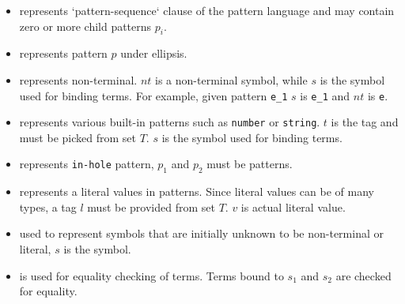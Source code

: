 \begin{itemize}
\item
\PatternSequence represents `pattern-sequence` clause of the pattern language and may contain zero or more child patterns $p_i$.

\item 
\Repeat represents pattern $p$ under ellipsis.

\item 
\Nt represents non-terminal. $nt$ is a non-terminal symbol, while $s$ is the symbol used for binding terms. For example, given pattern \texttt{e\_1} $s$ is \texttt{e\_1} and $nt$ is \texttt{e}.

\item
\BuiltInPattern represents various built-in patterns such as \texttt{number} or \texttt{string}. $t$ is the tag and must be picked from set $T$. $s$ is the symbol used for binding terms.

\item
\InHolePattern represents \texttt{in-hole} pattern, $p_1$ and $p_2$ must be patterns.

\item 
\LiteralPattern represents a literal values in patterns. Since literal values can be of many types, a tag $l$ must be provided from set $T$. $v$ is actual literal value.

\item 
\UnresolvedSymbol used to represent symbols that are initially unknown to be non-terminal or literal, $s$ is the symbol.

\item
\CheckConstraint is used for equality checking of terms. Terms bound to $s_1$ and $s_2$ are checked for equality.

\end{itemize}

